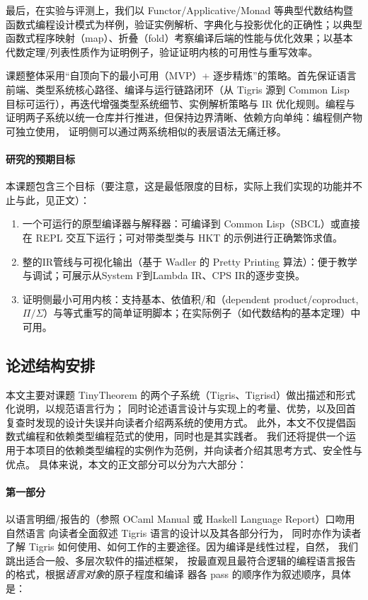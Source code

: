 \documentclass[a4paper, 11pt]{article}
\theoremstyle{remark}\newtheorem*{remark}{Remark}
\theoremstyle{definition}\newtheorem*{definition}{Definition}
\begin{document}
最后，在实验与评测上，我们以 Functor/Applicative/Monad 等典型代数结构暨函数式编程设计模式为样例，验证实例解析、字典化与投影优化的正确性；以典型函数式程序映射（map）、折叠（fold）考察编译后端的性能与优化效果；以基本代数定理/列表性质作为证明例子，验证证明内核的可用性与重写效率。

课题整体采用“自顶向下的最小可用（MVP）+ 逐步精炼”的策略。首先保证语言前端、类型系统核心路径、编译与运行链路闭环（从 Tigris 源到 Common Lisp 目标可运行），再迭代增强类型系统细节、实例解析策略与 IR 优化规则。编程与证明两子系统以统一仓库并行推进，但保持边界清晰、依赖方向单纯：编程侧产物可独立使用，
证明侧可以通过两系统相似的表层语法无痛迁移。

\paragraph{研究的预期目标}
本课题包含三个目标（要注意，这是最低限度的目标，实际上我们实现的功能并不止与此，见正文）：
\begin{enumerate}\itemsep0em
  \item 一个可运行的原型编译器与解释器：可编译到 Common Lisp（SBCL）或直接在 REPL 交互下运行；可对带类型类与 HKT 的示例进行正确繁饰求值。
  \item 整的IR管线与可视化输出（基于 Wadler 的 Pretty Printing 算法）：便于教学与调试；可展示从System F到Lambda IR、CPS IR的逐步变换。
  \item 证明侧最小可用内核：支持基本\lambdaterm、依值积/和（dependent product/coproduct, $\Pi/\Sigma$）与等式重写的简单证明脚本；在实际例子（如代数结构的基本定理）中可用。
\end{enumerate}

\subsection{论述结构安排}
本文主要对课题 TinyTheorem 的两个子系统（Tigris、Tigrisd）做出描述和形式化说明，以规范语言行为；
同时论述语言设计与实现上的考量、优势，以及回首复查时发现的设计失误并向读者介绍两系统的使用方式。
此外，本文不仅提倡函数式编程和依赖类型编程范式的使用，同时也是其实践者。
我们还将提供一个运用于本项目的依赖类型编程的实例作为范例，并向读者介绍其思考方式、安全性与优点。
具体来说，本文的正文部分可以分为六大部分：

\paragraph{第一部分}以语言明细/报告的（参照 OCaml Manual 或 Haskell Language Report）口吻用自然语言
向读者全面叙述 Tigris 语言的设计以及其各部分行为，
同时亦作为读者了解 Tigris 如何使用、如何工作的主要途径。因为编译是线性过程，自然，
我们跳出适合一般、多层次软件的描述框架，
按最直观且最符合逻辑的编程语言报告的格式，根据\emph{语言对象}的原子程度和编译
器各 pass 的顺序作为叙述顺序，具体是：
\end{document}

